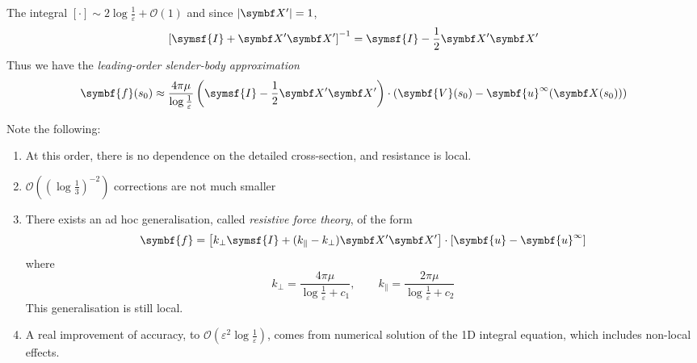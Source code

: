 \documentclass{jknotes}
\begin{document}
The integral $\left[ \cdot \right] \sim 2 \log \frac{1}{\varepsilon} +
\mathcal{O}(1)$ and since $\abs{\X'} = 1$,
\begin{equation}
	\left[\symsf{I} + \X' \X'\right]^{-1} = \symsf{I} - \frac{1}{2}\X'\X'
\end{equation}
Thus we have the \emph{leading-order slender-body approximation}
\begin{equation}
	\symbf{f}(s_0) \approx \frac{4\pi \mu}{\log \frac{1}{\varepsilon}} \left(
		\symsf{I} - \frac{1}{2} \X'\X' \right)\cdot\left(\symbf{V}(s_0) -
	\symbf{u}^\infty(\X(s_0))\right)
\end{equation}

Note the following:
\begin{enumerate}
	\item At this order, there is no dependence on the detailed cross-section,
		and resistance is local.
	\item $\mathcal{O}\left((\log \frac{1}{3})^{-2}\right)$ corrections are not
		much smaller
	\item  There exists an ad hoc generalisation, called \emph{resistive force
		theory}, of the form
		\begin{equation}
			\symbf{f} = \left[ k_{\perp} \symsf{I} + (k_{\parallel} - k_{\perp})
			\X' \X'\right] \cdot \left[ \symbf{u} - \symbf{u}^\infty\right]
		\end{equation}
		where
		\begin{equation}
			k_{\perp} = \frac{4\pi\mu}{\log \frac{1}{\varepsilon} + c_1},
			\hspace{2em} k_{\parallel} = \frac{2\pi \mu}{\log
			\frac{1}{\varepsilon} + c_2}
		\end{equation}
		This generalisation is still local.
	\item A real improvement of accuracy, to $\mathcal{O}(\varepsilon^2 \log
		\frac{1}{\varepsilon})$, comes from numerical solution of the 1D
		integral equation, which includes non-local effects.
\end{enumerate}
\end{document}
